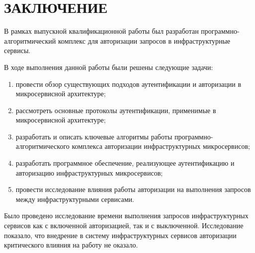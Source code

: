 {\centering \chapter*{ЗАКЛЮЧЕНИЕ}}

В рамках выпускной квалификационной работы был разработан программно-алгоритмический комплекс для авторизации запросов в инфраструктурные сервисы.

В ходе выполнения данной работы были решены следующие задачи:
\begin{enumerate}
\item провести обзор существующих подходов аутентификации и авторизации в микросервисной архитектуре;
\item рассмотреть основные протоколы аутентификации, применимые в микросервисной архитектуре;
\item разработать и описать ключевые алгоритмы работы программно-алгоритмического комплекса авторизации инфраструктурных микросервисов;
\item разработать программное обеспечение, реализующее аутентификацию и авторизацию инфраструктурных микросервисов;
\item провести исследование влияния работы авторизации на выполнения запросов между инфраструктурными сервисами.
\end{enumerate}

Было проведено исследование времени выполнения запросов инфраструктурных сервисов как с включенной авторизацией, так и с выключенной. Исследование показало, что внедрение в систему инфраструктурных сервисов авторизации критического влияния на работу не оказало.
